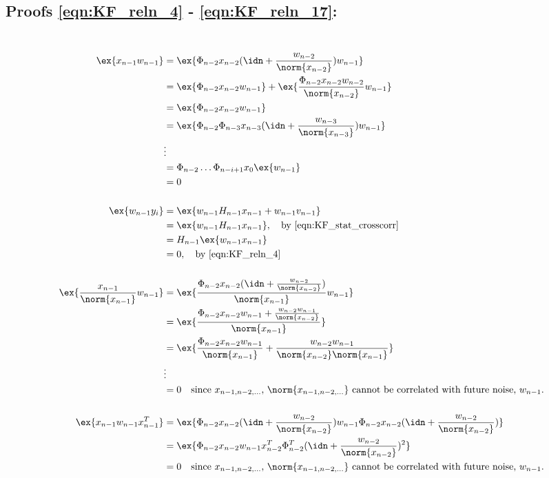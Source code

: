 \subsection{Proofs \ref{eqn:KF_reln_4} - \ref{eqn:KF_reln_17}:}
\\
\begin{align}
\ex{x_{n-1} w_{n-1}} & = \ex{\Phi_{n-2}x_{n-2}(\idn + \frac{w_{n-2}}{\norm{x_{n-2}}}) w_{n-1}} \\
& = \ex{\Phi_{n-2}x_{n-2}w_{n-1}} +\ex{ \frac{\Phi_{n-2}x_{n-2} w_{n-2}}{\norm{x_{n-2}}} w_{n-1}} \\
& = \ex{\Phi_{n-2}x_{n-2}w_{n-1}} \\
& = \ex{\Phi_{n-2}\Phi_{n-3}x_{n-3}(\idn + \frac{w_{n-3}}{\norm{x_{n-3}}})w_{n-1}} \\
& \vdots \\
& = \Phi_{n-2}\dots\Phi_{n-i+1}x_0\ex{w_{n-1}} \\
&= 0 \\
\nonumber \\ 
\ex{w_{n-1} y_i} &= \ex{w_{n-1}  H_{n-1} x_{n-1} + w_{n-1}v_{n-1}}  \\
 &= \ex{w_{n-1}  H_{n-1} x_{n-1}}, \quad\text{by \ref{eqn:KF_stat_crosscorr} } \\ 
 &= H_{n-1} \ex{w_{n-1} x_{n-1}} \\
 &= 0, \quad\text{by \ref{eqn:KF_reln_4}} \\
\nonumber \\ 
\ex{\frac{x_{n-1}}{\norm{x_{n-1}}}w_{n-1}} & = \ex{\frac{\Phi_{n-2}x_{n-2}(\idn + \frac{w_{n-2}}{\norm{x_{n-2}}})}{\norm{x_{n-1}}}w_{n-1}} \\
& = \ex{\frac{\Phi_{n-2}x_{n-2}w_{n-1} + \frac{w_{n-2}w_{n-1}}{\norm{x_{n-2}}}}{\norm{x_{n-1}}}} \\
& = \ex{\frac{\Phi_{n-2}x_{n-2}w_{n-1}}{\norm{x_{n-1}}} + \frac{w_{n-2}w_{n-1}}{\norm{x_{n-2}}\norm{x_{n-1}}}} \\
&\vdots \\
&= 0 \quad \text{since $x_{n-1, n-2, \dots}$, $\norm{x_{n-1,n-2, \dots}}$ cannot be correlated with future  noise, $w_{n-1}$.}\\
\nonumber \\ 
\ex{x_{n-1} w_{n-1} x_{n-1}^T} &= \ex{\Phi_{n-2}x_{n-2}(\idn + \frac{w_{n-2}}{\norm{x_{n-2}}}) w_{n-1} \Phi_{n-2}x_{n-2}(\idn + \frac{w_{n-2}}{\norm{x_{n-2}}})} \\
&= \ex{\Phi_{n-2}x_{n-2} w_{n-1} x_{n-2}^T\Phi_{n-2}^T(\idn + \frac{w_{n-2}}{\norm{x_{n-2}}})^2} \\
&= 0 \quad \text{since $x_{n-1, n-2, \dots}$, $\norm{x_{n-1,n-2, \dots}}$ cannot be correlated with future  noise, $w_{n-1}$.}
\end{align}
